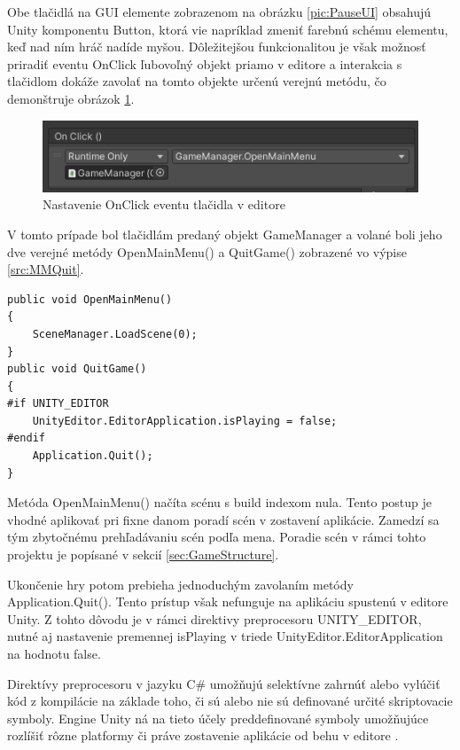 \documentclass[slovak, master]{diploma}
\begin{document}
Obe tlačidlá na GUI elemente zobrazenom na obrázku \ref{pic:PauseUI} obsahujú Unity komponentu Button, ktorá vie napríklad zmeniť farebnú schému elementu, keď nad ním hráč nadíde myšou. Dôležitejšou funkcionalitou je však možnosť priradiť eventu OnClick ľubovoľný objekt priamo v editore a interakcia s tlačidlom dokáže zavolať na tomto objekte určenú verejnú metódu, čo demonštruje obrázok \ref{pic:OnClick}. 

\begin{figure}[!htbp]
    \centering
    \includegraphics[width=.8\textwidth]{Figures/OnClick.png}
    \caption{Nastavenie OnClick eventu tlačidla v editore}
    \label{pic:OnClick}
\end{figure}

V tomto prípade bol tlačidlám predaný objekt GameManager a volané boli jeho dve verejné metódy OpenMainMenu() a QuitGame() zobrazené vo výpise \ref{src:MMQuit}.

\vspace{8pt}
\begin{lstlisting}[label=src:MMQuit,caption={Návrat do hlavnej ponuky a ukončenie hry}]
public void OpenMainMenu()
{
    SceneManager.LoadScene(0);
}
public void QuitGame()
{
#if UNITY_EDITOR
    UnityEditor.EditorApplication.isPlaying = false;
#endif
    Application.Quit();
}
\end{lstlisting}

Metóda OpenMainMenu() načíta scénu s build indexom nula. Tento postup je vhodné aplikovať pri fixne danom poradí scén v zostavení aplikácie. Zamedzí sa tým zbytočnému prehľadávaniu scén podľa mena. Poradie scén v rámci tohto projektu je popísané v sekcií \ref{sec:GameStructure}. 

Ukončenie hry potom prebieha jednoduchým zavolaním metódy Application.Quit(). Tento prístup však nefunguje na aplikáciu spustenú v editore Unity. Z tohto dôvodu je v rámci direktivy preprocesoru UNITY\_EDITOR, nutné aj nastavenie premennej isPlaying v triede UnityEditor.EditorApplication na hodnotu false. 

Direktívy preprocesoru v jazyku C\# umožňujú selektívne zahrnúť alebo vylúčiť kód z kompilácie na základe toho, či sú alebo nie sú definované určité skriptovacie symboly. Engine Unity ná na tieto účely preddefinované symboly umožňujúce rozlíšiť rôzne platformy či práve zostavenie aplikácie od behu v editore \cite{ConditionalCompilation}.
\end{document}
